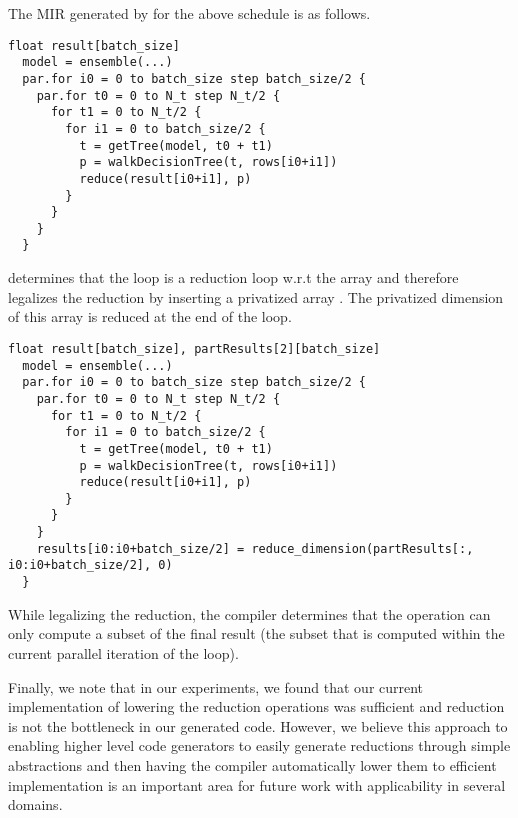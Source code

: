 The MIR generated by \Treebeard{} for the above schedule is as follows. 
\begin{lstlisting}[style=c++]
  float result[batch_size]
  model = ensemble(...) 
  par.for i0 = 0 to batch_size step batch_size/2 {
    par.for t0 = 0 to N_t step N_t/2 {
      for t1 = 0 to N_t/2 {
        for i1 = 0 to batch_size/2 {
          t = getTree(model, t0 + t1) 
          p = walkDecisionTree(t, rows[i0+i1])
          reduce(result[i0+i1], p)
        }
      }
    }
  }
\end{lstlisting}

\Treebeard{} determines that the  loop is a reduction 
loop w.r.t the  array and therefore legalizes 
the reduction by inserting a privatized array 
. The privatized dimension of this array 
is reduced at the end of the  loop.

\begin{lstlisting}[style=c++]
  float result[batch_size], partResults[2][batch_size]
  model = ensemble(...) 
  par.for i0 = 0 to batch_size step batch_size/2 {
    par.for t0 = 0 to N_t step N_t/2 {
      for t1 = 0 to N_t/2 {
        for i1 = 0 to batch_size/2 {
          t = getTree(model, t0 + t1) 
          p = walkDecisionTree(t, rows[i0+i1])
          reduce(result[i0+i1], p)
        }
      }
    }
    results[i0:i0+batch_size/2] = reduce_dimension(partResults[:, i0:i0+batch_size/2], 0)
  }
\end{lstlisting}

While legalizing the reduction, the compiler determines that the 
 operation can only compute a subset of the final 
result (the subset that is computed within the current parallel iteration of the 
 loop). 

Finally, we note that in our experiments, we found that our 
current implementation of lowering the reduction operations 
was sufficient and reduction is not the bottleneck in our 
generated code. However, we believe this approach to enabling 
higher level code generators to easily generate reductions 
through simple abstractions and then having the compiler 
automatically lower them to efficient implementation is an
important area for future work with applicability in several 
domains. 

